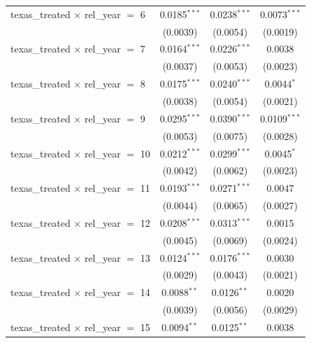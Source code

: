 \begin{tabular}{lccc}
   texas\_treated $\times$ rel\_year $=$ 6      & 0.0185$^{***}$ & 0.0238$^{***}$ & 0.0073$^{***}$\\   
                                                & (0.0039)       & (0.0054)       & (0.0019)\\   
   texas\_treated $\times$ rel\_year $=$ 7      & 0.0164$^{***}$ & 0.0226$^{***}$ & 0.0038\\   
                                                & (0.0037)       & (0.0053)       & (0.0023)\\   
   texas\_treated $\times$ rel\_year $=$ 8      & 0.0175$^{***}$ & 0.0240$^{***}$ & 0.0044$^{*}$\\   
                                                & (0.0038)       & (0.0054)       & (0.0021)\\   
   texas\_treated $\times$ rel\_year $=$ 9      & 0.0295$^{***}$ & 0.0390$^{***}$ & 0.0109$^{***}$\\   
                                                & (0.0053)       & (0.0075)       & (0.0028)\\   
   texas\_treated $\times$ rel\_year $=$ 10     & 0.0212$^{***}$ & 0.0299$^{***}$ & 0.0045$^{*}$\\   
                                                & (0.0042)       & (0.0062)       & (0.0023)\\   
   texas\_treated $\times$ rel\_year $=$ 11     & 0.0193$^{***}$ & 0.0271$^{***}$ & 0.0047\\   
                                                & (0.0044)       & (0.0065)       & (0.0027)\\   
   texas\_treated $\times$ rel\_year $=$ 12     & 0.0208$^{***}$ & 0.0313$^{***}$ & 0.0015\\   
                                                & (0.0045)       & (0.0069)       & (0.0024)\\   
   texas\_treated $\times$ rel\_year $=$ 13     & 0.0124$^{***}$ & 0.0176$^{***}$ & 0.0030\\   
                                                & (0.0029)       & (0.0043)       & (0.0021)\\   
   texas\_treated $\times$ rel\_year $=$ 14     & 0.0088$^{**}$  & 0.0126$^{**}$  & 0.0020\\   
                                                & (0.0039)       & (0.0056)       & (0.0029)\\   
   texas\_treated $\times$ rel\_year $=$ 15     & 0.0094$^{**}$  & 0.0125$^{**}$  & 0.0038\\   

\end{tabular}
